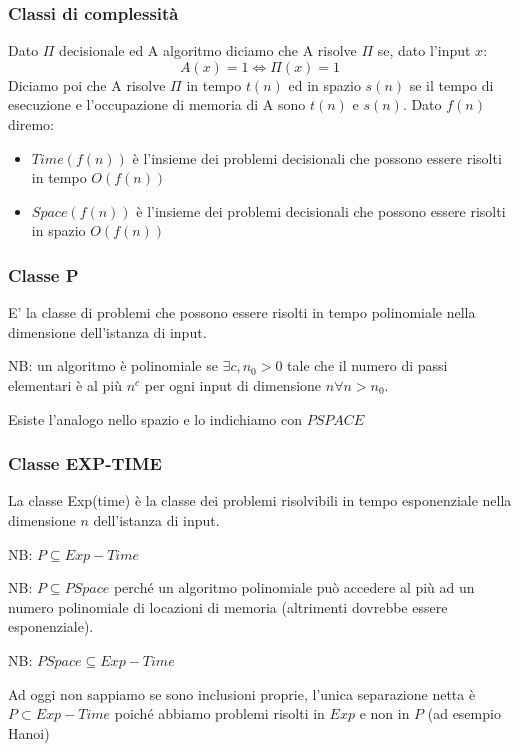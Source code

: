 \subsubsection{Classi di complessità}
Dato $\Pi$ decisionale ed A algoritmo diciamo che A risolve $\Pi$ se, dato l'input $x$:
$$ A(x) = 1 \Longleftrightarrow \Pi(x) = 1 $$
Diciamo poi che A risolve $\Pi$ in tempo $t(n)$ ed in spazio $s(n)$ se il tempo di esecuzione e l'occupazione di memoria di A sono $t(n)$ e $s(n)$. Dato $f(n)$ diremo:
\begin{itemize}
    \item $Time(f(n))$ è l'insieme dei problemi decisionali che possono essere risolti in tempo $O(f(n))$
    \item $Space(f(n))$ è l'insieme dei problemi decisionali che possono essere risolti in spazio $O(f(n))$
\end{itemize}

\subsubsection{Classe P}
E' la classe di problemi che possono essere risolti in tempo polinomiale nella dimensione dell'istanza di input.

NB: un algoritmo è polinomiale se $\exists c, n_0 > 0 $ tale che il numero di passi elementari è al più $n^c$ per ogni input di dimensione $n \forall n > n_0$.

Esiste l'analogo nello spazio e lo indichiamo con $PSPACE$

\subsubsection{Classe EXP-TIME}
La classe Exp(time) è la classe dei problemi risolvibili in tempo esponenziale nella dimensione $n$ dell'istanza di input.

NB: $P \subseteq Exp-Time$

NB: $P \subseteq PSpace$ perché un algoritmo polinomiale può accedere al più ad un numero polinomiale di locazioni di memoria (altrimenti dovrebbe essere esponenziale).

NB: $PSpace \subseteq Exp-Time$

Ad oggi non sappiamo se sono inclusioni proprie, l'unica separazione netta è $P \subset Exp-Time$ poiché abbiamo problemi risolti in $Exp$ e non in $P$ (ad esempio Hanoi)

